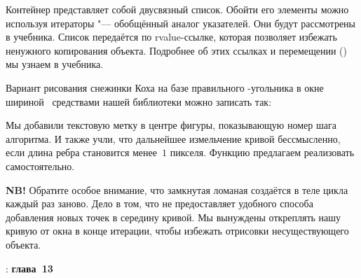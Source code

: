 Контейнер  представляет собой двусвязный список. Обойти его элементы можно используя итераторы "--- обобщённый аналог указателей. Они будут рассмотрены в  учебника. Список передаётся по rvalue-ссылке, которая позволяет избежать ненужного копирования объекта. Подробнее об этих ссылках и перемещении () мы узнаем в  учебника.

Вариант рисования снежинки Коха на базе правильного -угольника в окне шириной~ средствами нашей библиотеки  можно записать так:


Мы добавили текстовую метку в центре фигуры, показывающую номер шага алгоритма. И также учли, что дальнейшее измельчение кривой бессмысленно, если длина ребра становится менее~\(1\) пикселя. Функцию  предлагаем реализовать самостоятельно.

\textbf{NB!} Обратите особое внимание, что замкнутая ломаная создаётся в теле цикла каждый раз заново. Дело в том, что  не предоставляет удобного способа добавления новых точек в середину кривой. Мы вынуждены откреплять нашу кривую от окна в конце итерации, чтобы избежать отрисовки несуществующего объекта.






\WhatToReadSection
\textcite{Stroustrup:2016:ru}: \textbf{глава~13}



